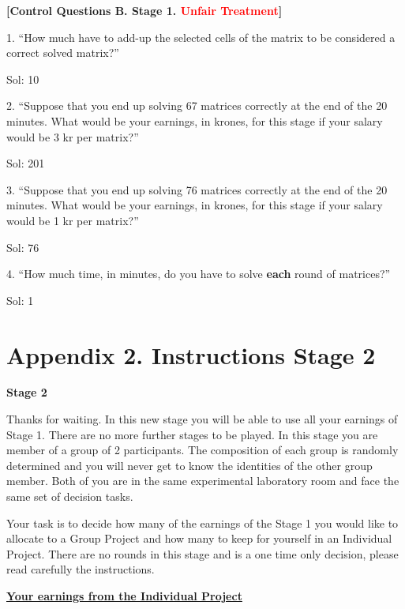 \documentclass[a4paper, 12pt]{article}
\begin{document}
\begin{appendices}
\begin{center}
\textbf{[Control Questions B. Stage 1. \textcolor{Red}{Unfair Treatment}]}
\end{center}
1. “How much have to add-up the selected cells of the matrix to be considered a correct solved matrix?”
\begin{center}
Sol: 10
\end{center}
2. “Suppose that you end up solving 67 matrices correctly at the end of the 20 minutes. What would be your earnings, in krones, for this stage if your salary would be 3 kr per matrix?” \\
\begin{center}
Sol: 201
\end{center}
3. “Suppose that you end up solving 76 matrices correctly at the end of the 20 minutes. What would be your earnings, in krones, for this stage if your salary would be 1 kr per matrix?” \\
\begin{center}
Sol: 76
\end{center}
4. “How much time, in minutes, do you have to solve \textbf{each} round of matrices?”
\begin{center}
Sol: 1
\end{center}

\chapter{\textbf{Appendix 2. Instructions Stage 2}}
\begin{center}
\textbf{Stage 2}
\end{center}

Thanks for waiting. In this new stage you will be able to use all your earnings of Stage 1. There are no more further stages to be played. In this stage you are member of a group of 2 participants. The composition of each group is randomly determined and you will never get to know the identities of the other group member. Both of you are in the same experimental laboratory room and face the same set of decision tasks.

Your task is to decide how many of the earnings of the Stage 1 you would like to allocate to a Group Project and how many to keep for yourself in an Individual Project. There are no rounds in this stage and is a one time only decision, please read carefully the instructions. 

\begin{center}
    \underline{\textbf{Your earnings from the Individual Project}} 
\end{center}


\end{appendices}
\end{document}
